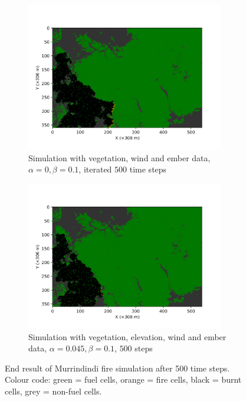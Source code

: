\begin{figure}[H]
\begin{subfigure}[t]{0.47\textwidth}
    \includegraphics[width=0.95\textwidth]{Figures/LastFrame_05.jpg}
    \caption{Simulation with vegetation, wind and ember data, $\alpha=0, \beta = 0.1$, iterated $500$ time steps}
    \label{fig:almostAllParams}
   \end{subfigure}
   \begin{subfigure}[t]{0.47\textwidth}
    \includegraphics[width=0.95\textwidth]{Figures/LastFrame_06.jpg}
    \caption{Simulation with vegetation, elevation, wind and ember data, $\alpha=0.045, \beta = 0.1$, $500$ steps}
    \label{fig:allParams}
   \end{subfigure}
   \caption{End result of Murrindindi fire simulation after 500 time steps.  Colour code: \newline green = fuel cells, orange = fire cells, black = burnt cells, grey = non-fuel cells.}
\end{figure}

